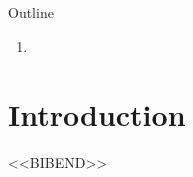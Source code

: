 
\begin{frame}\titlepage\end{frame}

\begin{frame}{Outline}
  \begin{enumerate}
    \item
  \end{enumerate}
\end{frame}

\section{Introduction}
\begin{frame}{}
\end{frame}

\appendix
<<BIBEND>>
